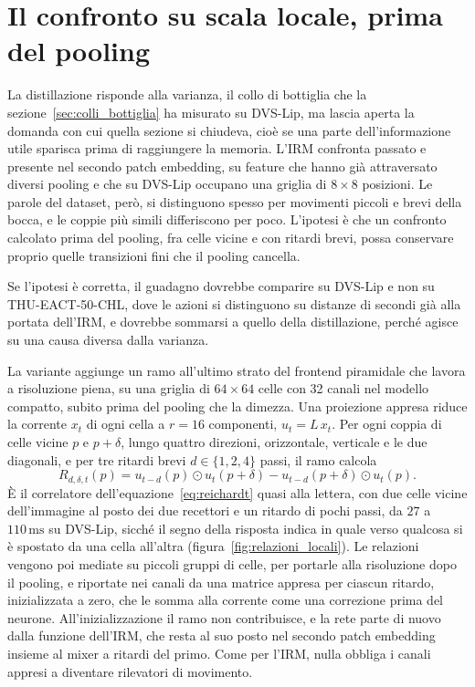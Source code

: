 \section{Il confronto su scala locale, prima del pooling}
\label{sec:relazioni_locali}

La distillazione risponde alla varianza, il collo di bottiglia che la sezione~\ref{sec:colli_bottiglia} ha misurato su DVS-Lip, ma lascia aperta la domanda con cui quella sezione si chiudeva, cioè se una parte dell'informazione utile sparisca prima di raggiungere la memoria. L'IRM confronta passato e presente nel secondo patch embedding, su feature che hanno già attraversato diversi pooling e che su DVS-Lip occupano una griglia di $8\times8$ posizioni. Le parole del dataset, però, si distinguono spesso per movimenti piccoli e brevi della bocca, e le coppie più simili differiscono per poco. L'ipotesi è che un confronto calcolato prima del pooling, fra celle vicine e con ritardi brevi, possa conservare proprio quelle transizioni fini che il pooling cancella.

Se l'ipotesi è corretta, il guadagno dovrebbe comparire su DVS-Lip e non su THU-EACT-50-CHL, dove le azioni si distinguono su distanze di secondi già alla portata dell'IRM, e dovrebbe sommarsi a quello della distillazione, perché agisce su una causa diversa dalla varianza.

La variante aggiunge un ramo all'ultimo strato del frontend piramidale che lavora a risoluzione piena, su una griglia di $64\times64$ celle con 32 canali nel modello compatto, subito prima del pooling che la dimezza. Una proiezione appresa riduce la corrente $x_t$ di ogni cella a $r=16$ componenti, $u_t=L\,x_t$. Per ogni coppia di celle vicine $p$ e $p+\delta$, lungo quattro direzioni, orizzontale, verticale e le due diagonali, e per tre ritardi brevi $d\in\{1,2,4\}$ passi, il ramo calcola
\begin{equation}
\label{eq:relazione_locale}
R_{d,\delta,t}(p)=u_{t-d}(p)\odot u_t(p+\delta)-u_{t-d}(p+\delta)\odot u_t(p).
\end{equation}
È il correlatore dell'equazione~\eqref{eq:reichardt} quasi alla lettera, con due celle vicine dell'immagine al posto dei due recettori e un ritardo di pochi passi, da $27$ a $110\,\mathrm{ms}$ su DVS-Lip, sicché il segno della risposta indica in quale verso qualcosa si è spostato da una cella all'altra (figura~\ref{fig:relazioni_locali}). Le relazioni vengono poi mediate su piccoli gruppi di celle, per portarle alla risoluzione dopo il pooling, e riportate nei canali da una matrice appresa per ciascun ritardo, inizializzata a zero, che le somma alla corrente come una correzione prima del neurone. All'inizializzazione il ramo non contribuisce, e la rete parte di nuovo dalla funzione dell'IRM, che resta al suo posto nel secondo patch embedding insieme al mixer a ritardi del primo. Come per l'IRM, nulla obbliga i canali appresi a diventare rilevatori di movimento.


